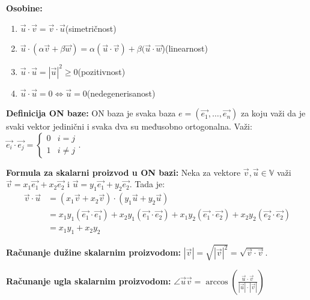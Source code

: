 \documentclass[12pt]{article}
\newcommand{\vek}[1]{\overrightarrow{#1}}
\begin{document}
\textbf{Osobine:}
\begin{enumerate}[label=\textit{\arabic*)}]
    \item $\vek{u}\cdot\vek{v}=\vek{v}\cdot\vek{u}$\hspace*{1cm}(simetričnost)
    \item $\vek{u}\cdot(\alpha\vek{v}+\beta\vek{w})=\alpha(\vek{u}\cdot\vek{v})
          +\beta(\vek{u}\cdot\vek{w}$)\hspace*{1cm}(linearnost)
    \item $\vek{u}\cdot\vek{u}=|\vek{u}|^2\geq0$\hspace*{1cm}(pozitivnost)
    \item $\vek{u}\cdot\vek{u}=0\iff\vek{u}=0$\hspace*{1cm}(nedegenerisanost)
\end{enumerate}
\par

\textbf{Definicija ON baze:} ON baza je svaka baza $e=(\vek{e_1},\dotsc,
    \vek{e_n})$ za koju važi da je svaki vektor jedinični i svaka dva su
međusobno ortogonalna. Važi: $\vek{e_i}\cdot\vek{e_j} =
    \begin{cases}
        0 & i=j     \\
        1 & i\neq j
    \end{cases}$.
\par

\textbf{Formula za skalarni proizvod u ON bazi:} Neka za vektore $\vek{v},
    \vek{u}\in\mathbb{V}$ važi $\vek{v}=x_1\vek{e_1}+x_2\vek{e_2}$ i
$\vek{u}=y_1\vek{e_1}+y_2\vek{e_2}$. Tada je:
\begin{align*}
    \vek{v}\cdot\vek{u} & = (x_1\vek{v}+x_2\vek{v})\cdot(y_1\vek{u}+y_2\vek{u})                                                                             \\
                        & = x_1y_1(\vek{e_1}\cdot\vek{e_1})+x_2y_1(\vek{e_1}\cdot\vek{e_2})+x_1y_2(\vek{e_1}\cdot\vek{e_2})+x_2y_2(\vek{e_2}\cdot\vek{e_2}) \\
                        & = x_1y_1+x_2y_2
\end{align*}
\par

\textbf{Računanje dužine skalarnim proizvodom:} $|\vek{v}|=\sqrt{|\vek{v}|^2}=
    \sqrt{\vek{v}\cdot\vek{v}}$.
\par

\textbf{Računanje ugla skalarnim proizvodom:} $\angle\vek{u}\vek{v}=
    \arccos(\frac{\vek{u}\cdot\vek{v}}{|\vek{u}|\cdot|\vek{v}|})$
\par
\end{document}
